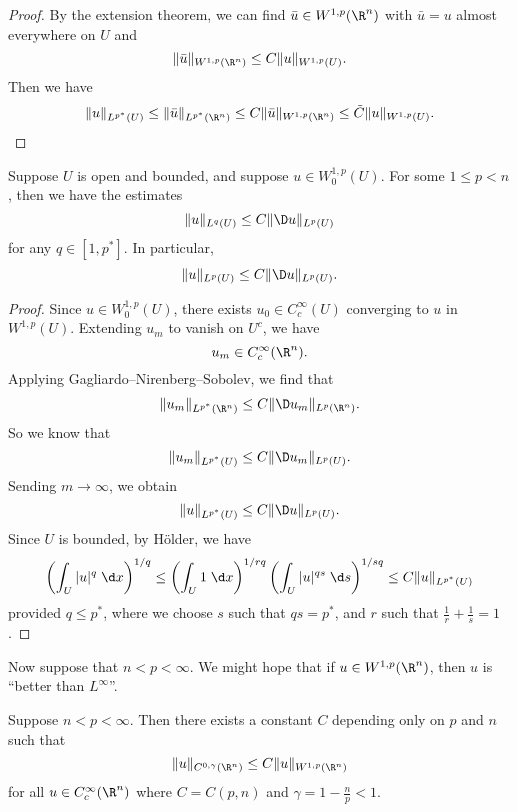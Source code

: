 \documentclass[a4paper]{article}
\begin{document}
\begin{proof}
  By the extension theorem, we can find $\bar{u} \in W^{1, p}(\R^n)$ with $\bar{u} = u$ almost everywhere on $U$ and
  \[
    \|\bar{u}\|_{W^{1, p}(\R^n)} \leq C \|u\|_{W^{1, p}(U)}.
  \]
  Then we have
  \[
    \|u\|_{L^{p^*}(U)} \leq \|\bar{u}\|_{L^{p^*}(\R^n)} \leq C \|\bar{u}\|_{W^{1, p}(\R^n)} \leq \tilde{C} \|u\|_{W^{1, p}(U)}.
  \]
\end{proof}

\begin{cor}
  Suppose $U$ is open and bounded, and suppose $u \in W^{1, p}_0(U)$. For some $1 \leq p < n$, then we have the estimates
  \[
    \|u\|_{L^q(U)} \leq C \|\D u\|_{L^p(U)}
  \]
  for any $q \in [1, p^*]$. In particular,
  \[
    \|u\|_{L^p(U)} \leq C \|\D u\|_{L^p(U)}.
  \]
\end{cor}

\begin{proof}
  Since $u \in W_0^{1, p}(U)$, there exists $u_0 \in C_c^\infty (U)$ converging to $u$ in $W^{1, p}(U)$. Extending $u_m$ to vanish on $U^c$, we have
  \[
    u_m \in C_c^\infty(\R^n).
  \]
  Applying Gagliardo--Nirenberg--Sobolev, we find that
  \[
    \|u_m\|_{L^{p^*}(\R^n)} \leq C \|\D u_m\|_{L^p(\R^n)}.
  \]
  So we know that
  \[
    \|u_m\|_{L^{p^*}(U)} \leq C \|\D u_m\|_{L^p(U)}.
  \]
  Sending $m \to \infty$, we obtain
  \[
    \|u\|_{L^{p^*}(U)} \leq C \|\D u\|_{L^p(U)}.
  \]
  Since $U$ is bounded, by H\"older, we have
  \[
    \left(\int_U |u|^q\;\d x\right)^{1/q} \leq \left(\int_U 1 \;\d x \right)^{1/rq} \left(\int_U |u|^{qs}\;\d s \right)^{1/sq} \leq C \|u\|_{L^{p^*}(U)}
  \]
  provided $q \leq p^*$, where we choose $s$ such that $qs = p^*$, and $r$ such that $\frac{1}{r} + \frac{1}{s} = 1$.
\end{proof}

Now suppose that $n < p < \infty$. We might hope that if $u \in W^{1, p}(\R^n)$, then $u$ is ``better than $L^\infty$''.

\begin{thm}
  Suppose $n < p < \infty$. Then there exists a constant $C$ depending only on $p$ and $n$ such that
  \[
    \|u\|_{C^{0, \gamma}(\R^n)} \leq C \|u\|_{W^{1, p}(\R^n)}
  \]
  for all $u \in C^\infty_c (\R^n)$ where $C = C(p, n)$ and $\gamma = 1 - \frac{n}{p} < 1$.
\end{thm}
\end{document}
